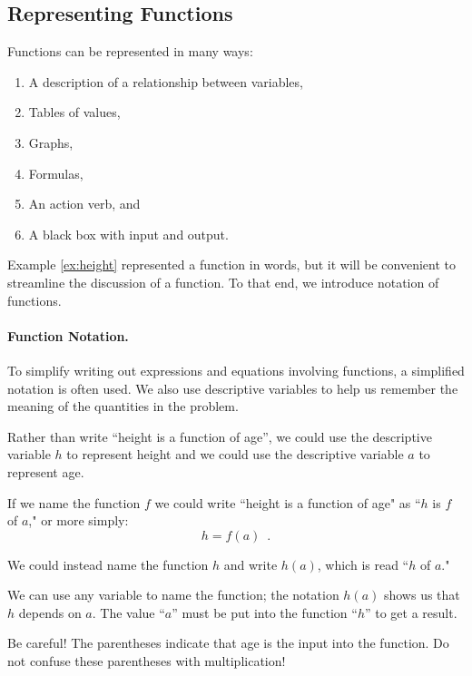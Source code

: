 \subsection{Representing Functions}

Functions can be represented in many ways:
    \begin{multicols}{2}
    \begin{enumerate}
        \item A description of a relationship between variables,
        \item Tables of values,
        \item Graphs,
        \item Formulas,
        \item An action verb, and
        \item A black box with input and output.
    \end{enumerate}
    \end{multicols}
Example \ref{ex:height} represented a function in words, but it will be convenient to streamline the discussion of a function. To that end, we introduce notation of functions.

\paragraph{Function Notation.}

To simplify writing out expressions and equations involving functions, a simplified notation is often used. We also use descriptive variables to help us remember the meaning of the quantities in the problem.

Rather than write ``height is a function of age'', we could use the descriptive variable $h$ to represent height and we could use the descriptive variable $a$ to represent age.

If we name the function $f$ we could write ``height is a function of age" as ``$h$ is $f$ of $a$," or more simply:
$$h = f(a) \enspace .$$

We could instead name the function $h$ and write $h(a)$, which is read ``$h$ of $a$."

We can use any variable to name the function; the notation $h(a)$ shows us that $h$ depends on $a$. The value ``$a$'' must be put into the function ``$h$'' to get a result.

\begin{remark}
Be careful! The parentheses indicate that age is the input into the function. Do not confuse these parentheses with multiplication!
\end{remark}

